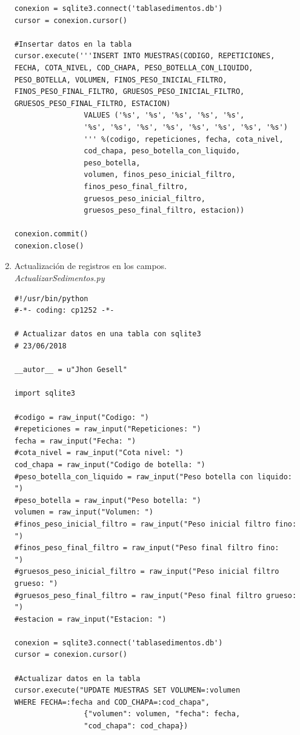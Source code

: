 \documentclass[12pt,a4paper]{report}
\begin{document}
\begin{enumerate}
\begin{lstlisting}
conexion = sqlite3.connect('tablasedimentos.db')
cursor = conexion.cursor()

#Insertar datos en la tabla
cursor.execute('''INSERT INTO MUESTRAS(CODIGO, REPETICIONES,
FECHA, COTA_NIVEL, COD_CHAPA, PESO_BOTELLA_CON_LIQUIDO,
PESO_BOTELLA, VOLUMEN, FINOS_PESO_INICIAL_FILTRO,
FINOS_PESO_FINAL_FILTRO, GRUESOS_PESO_INICIAL_FILTRO, 
GRUESOS_PESO_FINAL_FILTRO, ESTACION)
                VALUES ('%s', '%s', '%s', '%s', '%s',
                '%s', '%s', '%s', '%s', '%s', '%s', '%s', '%s')
                ''' %(codigo, repeticiones, fecha, cota_nivel,
                cod_chapa, peso_botella_con_liquido,
                peso_botella,
                volumen, finos_peso_inicial_filtro,
                finos_peso_final_filtro,
                gruesos_peso_inicial_filtro,
                gruesos_peso_final_filtro, estacion))

conexion.commit()
conexion.close()
\end{lstlisting}

\item Actualización de registros en los campos. \\
\textit{ActualizarSedimentos.py}
\begin{lstlisting}
#!/usr/bin/python
#-*- coding: cp1252 -*-

# Actualizar datos en una tabla con sqlite3
# 23/06/2018

__autor__ = u"Jhon Gesell"

import sqlite3

#codigo = raw_input("Codigo: ")
#repeticiones = raw_input("Repeticiones: ")
fecha = raw_input("Fecha: ")
#cota_nivel = raw_input("Cota nivel: ")
cod_chapa = raw_input("Codigo de botella: ")
#peso_botella_con_liquido = raw_input("Peso botella con liquido:
")
#peso_botella = raw_input("Peso botella: ")
volumen = raw_input("Volumen: ")
#finos_peso_inicial_filtro = raw_input("Peso inicial filtro fino:
")
#finos_peso_final_filtro = raw_input("Peso final filtro fino:
")
#gruesos_peso_inicial_filtro = raw_input("Peso inicial filtro
grueso: ")
#gruesos_peso_final_filtro = raw_input("Peso final filtro grueso:
")
#estacion = raw_input("Estacion: ")

conexion = sqlite3.connect('tablasedimentos.db')
cursor = conexion.cursor()

#Actualizar datos en la tabla
cursor.execute("UPDATE MUESTRAS SET VOLUMEN=:volumen
WHERE FECHA=:fecha and COD_CHAPA=:cod_chapa",
                {"volumen": volumen, "fecha": fecha,
                "cod_chapa": cod_chapa})


\end{lstlisting}
\end{enumerate}
\end{document}
